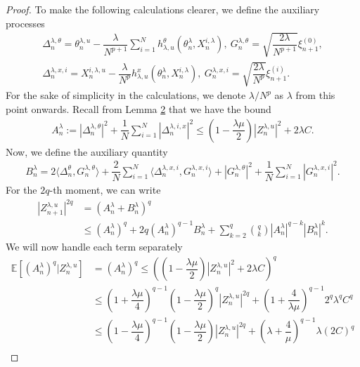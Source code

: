 \documentclass[a4paper, 10pt]{article}
\theoremstyle{plain}%
\begin{document}
\begin{proof}
To make the following calculations clearer, we define the auxiliary processes
\begin{gather*}
\Delta_n^{\lambda,\theta}=\theta_{n}^{\lambda,u}-\dfrac{\lambda}{N^{p+1}}\sum_{i=1}^N h^{\theta}_{\lambda,u}\left(\theta_n^{\lambda},X^{i,\lambda}_n\right), \ G_n^{\lambda,\theta}=\sqrt{\dfrac{2\lambda}{N^{p+1}}}\xi^{(0)}_{n+1},\\
\Delta_n^{\lambda,x,i}=X_{n}^{i,\lambda,u}-\dfrac{\lambda}{N^p} h^{x}_{\lambda,u}\left(\theta_n^{\lambda},X^{i,\lambda}_n\right), \ G_n^{\lambda,x,i}=\sqrt{\dfrac{2\lambda}{N^p}}\xi^{(i)}_{n+1}.
\end{gather*}
For the sake of simplicity in the calculations, we denote $\lambda/N^p$ as $\lambda$ from this point onwards. Recall from Lemma \hyperlink{lemma1}{2} that we have the bound
\begin{gather*}
A_n^{\lambda}:=|\Delta_n^{\lambda,\theta}|^2+\dfrac{1}{N}\sum_{i=1}^N|\Delta_n^{\lambda,i,x}|^2\leq \left(1-\dfrac{\lambda\mu}{2}\right)|Z_n^{\lambda,u}|^2+2\lambda C.
\end{gather*}
Now, we define the auxiliary quantity
\begin{gather*}
B^{\lambda}_n=2\langle \Delta_n^{\theta},G_n^{\lambda,\theta}\rangle+\dfrac{2}{N}\sum_{i=1}^N\langle \Delta_n^{\lambda,x,i},G_n^{\lambda,x,i}\rangle+|G_n^{\lambda,\theta}|^2+\dfrac{1}{N}\sum_{i=1}^N|G_n^{\lambda,x,i}|^2.
\end{gather*}
For the $2q$-th moment, we can write
\begin{align}
|Z_{n+1}^{\lambda,u}|^{2q}&=\left(A_n^{\lambda}+B^{\lambda}_n\right)^q\nonumber \\
&\leq (A_n^{\lambda})^q+2q(A_n^{\lambda})^{q-1}B^{\lambda}_n+\sum_{k=2}^q\binom{q}{k}|A_n^{\lambda}|^{q-k}|B^{\lambda}_n|^k. \label{eq:010}
\end{align}
We will now handle each term separately
\begin{align}
\mathbb{E}\left[(A_n^{\lambda})^q|Z_n^{\lambda,u}\right]&=(A_n^{\lambda})^{q}\leq \left(\left(1-\dfrac{\lambda\mu}{2}\right)|Z_n^{\lambda,u}|^2+2\lambda C\right)^q\nonumber\\
&\leq \left(1+\dfrac{\lambda \mu}{4}\right)^{q-1}\left(1-\dfrac{\lambda\mu}{2}\right)^q|Z_n^{\lambda,u}|^{2q}+\left(1+\dfrac{4}{\lambda\mu }\right)^{q-1}2^q{\lambda}^q C^q\nonumber\\
&\leq \left(1-\dfrac{\lambda\mu}{4}\right)^{q-1}\left(1-\dfrac{\lambda\mu}{2}\right)|Z_n^{\lambda,u}|^{2q}+\left(\lambda+\dfrac{4}{\mu }\right)^{q-1}\lambda (2C)^q\nonumber\\

\end{align}
\end{proof}
\end{document}
